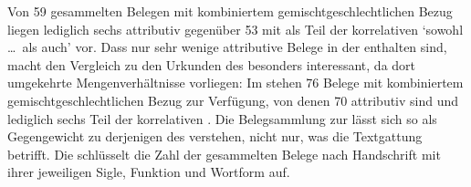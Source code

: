 Von 59 gesammelten Belegen mit kombiniertem gemischtgeschlechtlichen Bezug
liegen lediglich sechs attributiv gegenüber 53 mit 
als Teil der korrelativen   `sowohl
\dots\ als auch' vor. Dass nur sehr wenige attributive Belege in
der  enthalten sind, macht den Vergleich zu den
Urkunden des \CAO{} besonders interessant, da dort umgekehrte
Mengenverhältnisse vorliegen: Im \CAO{} stehen 76 Belege mit kombiniertem
gemischtgeschlechtlichen Bezug zur Verfügung, von denen 70
attributiv sind und lediglich sechs Teil der korrelativen
. Die Belegsammlung zur \KC{} lässt sich so als Gegengewicht
zu derjenigen des \CAO{} verstehen, nicht nur, was die Textgattung betrifft.
Die  schlüsselt die Zahl der gesammelten Belege nach
Handschrift mit ihrer jeweiligen Sigle, Funktion und Wortform auf.

